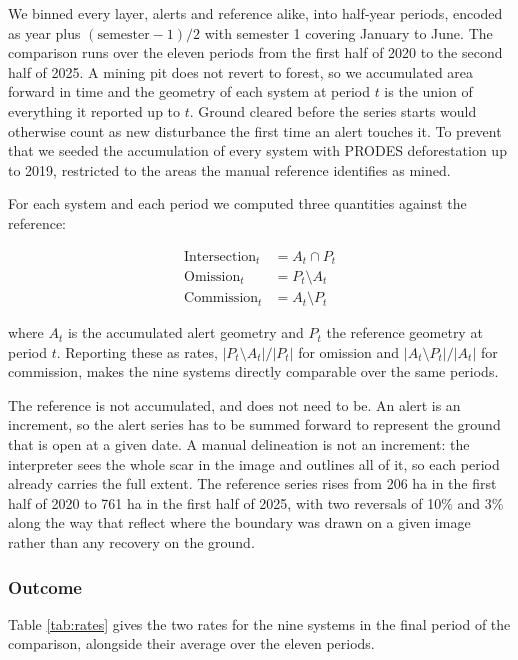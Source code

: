 \documentclass[11pt]{article}
\begin{document}
We binned every layer, alerts and reference alike, into half-year periods, encoded as year plus $(\text{semester}-1)/2$ with semester 1 covering January to June. The comparison runs over the eleven periods from the first half of 2020 to the second half of 2025. A mining pit does not revert to forest, so we accumulated area forward in time and the geometry of each system at period $t$ is the union of everything it reported up to $t$. Ground cleared before the series starts would otherwise count as new disturbance the first time an alert touches it. To prevent that we seeded the accumulation of every system with PRODES deforestation up to 2019, restricted to the areas the manual reference identifies as mined.

For each system and each period we computed three quantities against the reference:

\begin{align}
\text{Intersection}_t &= A_t \cap P_t \\
\text{Omission}_t &= P_t \setminus A_t \\
\text{Commission}_t &= A_t \setminus P_t
\end{align}

where $A_t$ is the accumulated alert geometry and $P_t$ the reference geometry at period $t$. Reporting these as rates, $|P_t \setminus A_t| / |P_t|$ for omission and $|A_t \setminus P_t| / |A_t|$ for commission, makes the nine systems directly comparable over the same periods.

The reference is not accumulated, and does not need to be. An alert is an increment, so the alert series has to be summed forward to represent the ground that is open at a given date. A manual delineation is not an increment: the interpreter sees the whole scar in the image and outlines all of it, so each period already carries the full extent. The reference series rises from 206 ha in the first half of 2020 to 761 ha in the first half of 2025, with two reversals of 10\% and 3\% along the way that reflect where the boundary was drawn on a given image rather than any recovery on the ground.

\subsubsection{Outcome}

Table \ref{tab:rates} gives the two rates for the nine systems in the final period of the comparison, alongside their average over the eleven periods.
\end{document}

